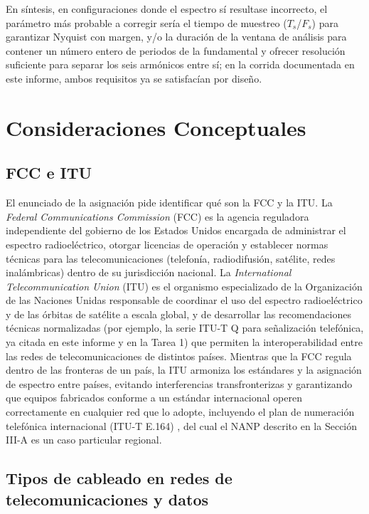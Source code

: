 \documentclass[conference]{IEEEtran}
\begin{document}
En síntesis, en configuraciones donde el espectro sí resultase incorrecto, el parámetro más probable a corregir sería el tiempo de muestreo ($T_s$/$F_s$) para garantizar Nyquist con margen, y/o la duración de la ventana de análisis para contener un número entero de periodos de la fundamental y ofrecer resolución suficiente para separar los seis armónicos entre sí; en la corrida documentada en este informe, ambos requisitos ya se satisfacían por diseño.

\section{Consideraciones Conceptuales}

\subsection{FCC e ITU}

El enunciado de la asignación pide identificar qué son la FCC y la ITU. La \textit{Federal Communications Commission} (FCC) es la agencia reguladora independiente del gobierno de los Estados Unidos encargada de administrar el espectro radioeléctrico, otorgar licencias de operación y establecer normas técnicas para las telecomunicaciones (telefonía, radiodifusión, satélite, redes inalámbricas) dentro de su jurisdicción nacional. La \textit{International Telecommunication Union} (ITU) es el organismo especializado de la Organización de las Naciones Unidas responsable de coordinar el uso del espectro radioeléctrico y de las órbitas de satélite a escala global, y de desarrollar las recomendaciones técnicas normalizadas (por ejemplo, la serie ITU-T Q para señalización telefónica, ya citada en este informe y en la Tarea 1) que permiten la interoperabilidad entre las redes de telecomunicaciones de distintos países. Mientras que la FCC regula dentro de las fronteras de un país, la ITU armoniza los estándares y la asignación de espectro entre países, evitando interferencias transfronterizas y garantizando que equipos fabricados conforme a un estándar internacional operen correctamente en cualquier red que lo adopte, incluyendo el plan de numeración telefónica internacional (ITU-T E.164) \cite{itu-e164}, del cual el NANP descrito en la Sección III-A es un caso particular regional.

\subsection{Tipos de cableado en redes de telecomunicaciones y datos}
\end{document}

